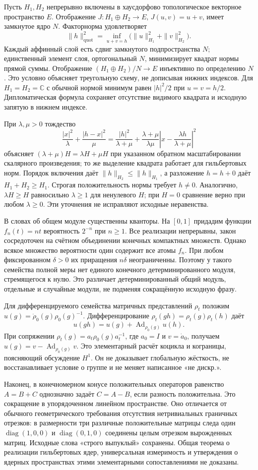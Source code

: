 \documentclass[11pt]{article}
\begin{document}
Пусть $H_1,H_2$ непрерывно включены в хаусдорфово топологическое векторное пространство $E$. Отображение $J:H_1\oplus H_2\to E$, $J(u,v)=u+v$, имеет замкнутое ядро $N$. Факторнорма удовлетворяет
\[
\|h\|_{\mathrm{quot}}^2
=\inf_{u+v=h}\bigl(\|u\|_{H_1}^2+\|v\|_{H_2}^2\bigr).
\]
Каждый аффинный слой есть сдвиг замкнутого подпространства $N$; единственный элемент слоя, ортогональный $N$, минимизирует квадрат нормы прямой суммы. Отображение $(H_1\oplus H_2)/N\to E$ инъективно по определению $N$. Это условно объясняет треугольную схему, не дописывая нижних индексов. Для $H_1=H_2=\mathbb C$ с обычной нормой минимум равен $|h|^2/2$ при $u=v=h/2$. Дипломатическая формула сохраняет отсутствие видимого квадрата и исходную запятую в нижнем индексе.

При $\lambda,\mu>0$ тождество
\[
\frac{|x|^2}{\lambda}+\frac{|h-x|^2}{\mu}
=\frac{|h|^2}{\lambda+\mu}
+\frac{\lambda+\mu}{\lambda\mu}
 \left|x-\frac{\lambda h}{\lambda+\mu}\right|^2
\]
объясняет $(\lambda+\mu)H=\lambda H+\mu H$ при указанном обратном масштабировании скалярного произведения; то же выделение квадрата работает для гильбертовых норм. Порядок включения даёт $\|h\|_{H_2}\leq\|h\|_{H_1}$, а разложение $h=h+0$ даёт $H_1+H_2\geq H_1$. Строгая положительность нормы требует $h\ne0$. Аналогично, $\lambda H\geq H$ равносильно $\lambda\geq1$ для ненулевого $H$; при $H=0$ сравнение верно при любом $\lambda\geq0$. Эти уточнения не исправляют исходные неравенства.

В словах об общем модуле существенны кванторы. На $[0,1]$ придадим функции $f_n(t)=nt$ вероятность $2^{-n}$ при $n\geq1$. Все реализации непрерывны, закон сосредоточен на счётном объединении конечных компактных множеств. Однако всякое множество вероятности один содержит все атомы $f_n$. При любом фиксированном $\delta>0$ их приращения $n\delta$ неограниченны. Поэтому у такого семейства полной меры нет единого конечного детерминированного модуля, стремящегося к нулю. Это различает детерминированный общий модуль, отдельные и случайные модули, не подменяя сокращённую исходную фразу.

Для дифференцируемого семейства матричных представлений $\rho_t$ положим
$u(g)=\dot\rho_0(g)\rho_0(g)^{-1}$. Дифференцирование
$\rho_t(gh)=\rho_t(g)\rho_t(h)$ даёт
\[
u(gh)=u(g)+\operatorname{Ad}_{\rho_0(g)}u(h).
\]
При сопряжении $\rho_t(g)=a_t\rho_0(g)a_t^{-1}$, где $a_0=I$ и $v=\dot a_0$, получаем $u(g)=v-\operatorname{Ad}_{\rho_0(g)}v$. Это элементарный расчёт коцикла и кограницы, поясняющий обсуждение $H^1$. Он не доказывает глобальную жёсткость, не восстанавливает условие о группе и не меняет написанное «не дискр.».

Наконец, в конечномерном конусе положительных операторов равенство $A=B+C$ однозначно задаёт $C=A-B$, если разность положительна. Это сокращение в упорядоченном линейном пространстве. Оно отличается от обычного геометрического требования отсутствия нетривиальных граничных отрезков: в размерности три различные положительные матрицы следа один $\operatorname{diag}(1,0,0)$ и $\operatorname{diag}(0,1,0)$ соединены целым отрезком вырожденных матриц. Исходные слова «строго выпуклый» сохранены. Общая теорема о реализации гильбертовых ядер, универсальная измеримость и утверждения о ядерных пространствах этими элементарными сопоставлениями не доказаны.
\end{document}
